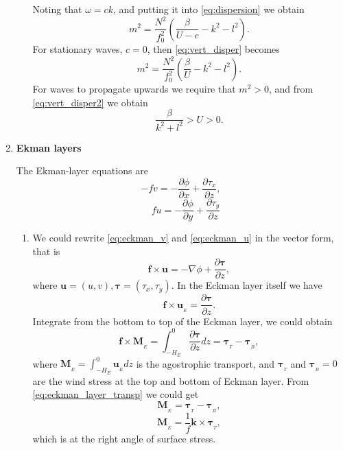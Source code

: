 \documentclass[a4paper]{article}
\begin{document}
\begin{enumerate}[label=\textbf{\arabic*.}]
\begin{enumerate}[label=\textbf{(\alph*)}]
			Noting that $\omega = ck$, and putting it into \ref{eq:dispersion} we obtain
			\begin{equation}\label{eq:vert_disper}
				m^2=\frac{N^2}{f_0^2}\left(\frac{\beta}{U-c}-k^2-l^2\right).
			\end{equation}
			For stationary waves, $c=0$, then \eqref{eq:vert_disper} becomes
			\begin{equation}\label{eq:vert_disper2}
				m^2=\frac{N^2}{f_0^2}\left(\frac{\beta}{U}-k^2-l^2\right).
			\end{equation}
			For waves to propagate upwards we require that $m^2>0$, and from \eqref{eq:vert_disper2} we obtain
			$$\frac{\beta}{k^2+l^2}>U>0.$$
	\end{enumerate}

\item \textbf{Ekman layers}

 The Ekman-layer equations are
	\begin{equation}\label{eq:eckman_v}
		- f v = - \frac { \partial \phi } { \partial x } + \frac { \partial \tau _ { x } } { \partial z } ,
	\end{equation}
	\begin{equation}\label{eq:eckman_u}
		\quad f u = - \frac { \partial \phi } { \partial y } + \frac { \partial \tau _ { y } } { \partial z }
	\end{equation}

		\begin{enumerate}[label=\textbf{(\alph*)}]
		\setcounter{enumii}{0}
		\item 
		We could rewrite \eqref{eq:eckman_v} and \eqref{eq:eckman_u} in the vector form, that is
		\begin{equation}
			\bm f\times \bm u = -\nabla \phi +  \frac{\partial \bm\tau } { \partial z },
		\end{equation}
		where $\bm u=(u,v), \bm \tau =(\tau_x, \tau_y)$. In the  Eckman layer itself we have
		\begin{equation}\label{eq:eckman_layer_vec}
			\bm f\times \bm u_{_E} =  \frac{\partial \bm\tau } { \partial z }.
		\end{equation}
		Integrate from the bottom to top of the Eckman layer, we could obtain
		\begin{equation}\label{eq:eckman_layer_transp}
			\bm f\times \bm M_{_E}=  \int_{-H_E}^{0} \frac{\partial \bm\tau } { \partial z }dz=\bm \tau_{_T}-\bm \tau_{_B},
		\end{equation} 
		where $\bm M_{_E}=\int_{-H_E}^{0} \bm u_{_E}dz$ is the agostrophic transport, and $\bm \tau_{_T}$ and $\bm \tau_{_B}=0$ are the wind stress at the top and bottom of Eckman layer. From \eqref{eq:eckman_layer_transp} we could get
		$$\bm M_{_E}= \bm \tau_{_T}-\bm \tau_{_B},$$
		$$\bm M_{_E}= \frac{1}{f}\bm {k}\times \bm \tau_{_T}, $$ which is at the right angle of surface stress.
		

\end{enumerate}
\end{enumerate}
\end{document}
